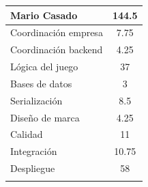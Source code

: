 \documentclass[11pt]{article}
\begin{document}
\begin{center}
\begin{longtable}{|l|S[table-format=3.2]|}
				\hline 
				\hline 
				\textbf{Mario Casado} & 144.5 \\
				\hline
				Coordinación empresa & 7.75 \\
				\hline
				Coordinación backend & 4.25 \\
				\hline 
				Lógica del juego & 37 \\
				\hline 
				Bases de datos & 3 \\
				\hline 
				Serialización &8.5 \\ 
				\hline 
				Diseño de marca & 4.25 \\
				\hline 
				Calidad & 11 \\
				\hline 
				Integración & 10.75 \\
				\hline 
				Despliegue & 58 \\
				\hline 

				\pagebreak


\end{longtable}
\end{center}
\end{document}
